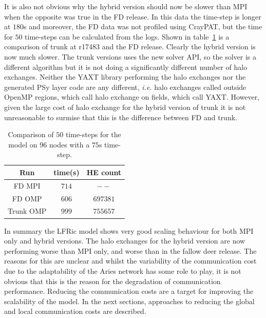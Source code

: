 It is also not obvious why the hybrid version should now be slower
than MPI when the opposite was true in the FD release. In this data
the time-step is longer at $180$s and moreover, the FD data was not
profiled using CrayPAT, but the time for $50$ time-steps can be calculated
from the logs. Shown in table~\ref{fig:fd_comp} is a comparison of
trunk at r17483 and the FD release. Clearly the hybrid version is now
much slower. The trunk versions uses the new solver API, so the solver
is a different algorithm but it is not doing a significantly different
number of halo exchanges. Neither the YAXT library performing the halo
exchanges nor the generated PSy layer code are any different, {\em
  i.e.} halo exchanges called outside OpenMP regions, which call halo
exchange on fields, which call YAXT. However,
given the large cost of halo exchange for the hybrid version of trunk
it is not unreasonable to surmise that this is the difference between
FD and trunk.

\begin{table}
\centering
\caption{\label{fig:fd_comp}Comparison of $50$ time-steps for the model on $96$ nodes
  with a $75$s time-step.}
\begin{tabular}{ccc}
Run & time(s) & HE count \\\hline
FD MPI & $714$ & $--$ \\
FD OMP & $606$ & $697381$ \\
Trunk OMP & $999$ & $755657$  
\end{tabular}
\end{table}

In summary the LFRic model shows very good scaling behaviour for both
MPI only and hybrid versions. The halo exchanges for the hybrid
version are now performing worse than MPI only, and worse than in the
fallow deer release. The reasons for this are unclear and whilst the
variability of the communication cost due to the adaptability of the
Aries network has some role to play, it is not obvious that this is
the reason for the degradation of communication performance. Reducing
the communication costs are a target for improving the scalability of
the model. In the next sections, approaches to reducing the global
and local communication costs are described.